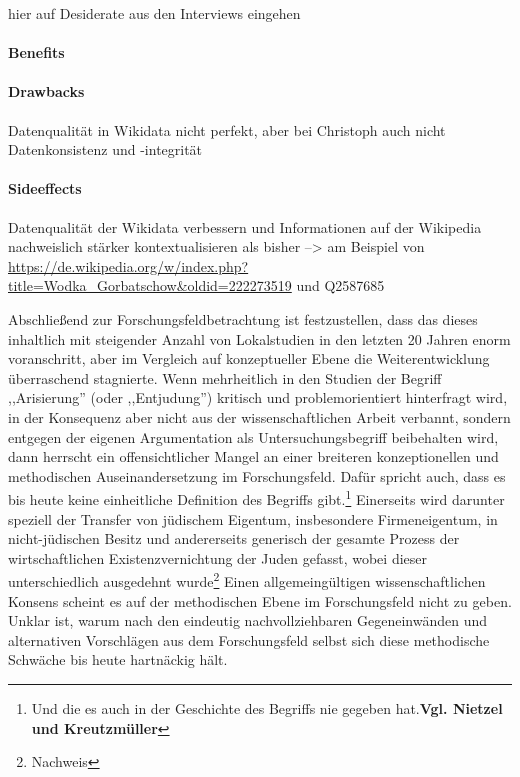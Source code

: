 hier auf Desiderate aus den Interviews eingehen

\paragraph{Benefits}

\paragraph{Drawbacks}

Datenqualität in Wikidata nicht perfekt, aber bei Christoph auch nicht
Datenkonsistenz und -integrität

\paragraph{Sideeffects}

Datenqualität der Wikidata verbessern und Informationen auf der Wikipedia nachweislich stärker kontextualisieren als bisher
--> am Beispiel von \url{https://de.wikipedia.org/w/index.php?title=Wodka_Gorbatschow&oldid=222273519} und Q2587685

Abschließend zur Forschungsfeldbetrachtung ist festzustellen, dass das dieses inhaltlich mit steigender Anzahl von Lokalstudien in den letzten 20 Jahren enorm voranschritt, aber im Vergleich auf konzeptueller Ebene die Weiterentwicklung überraschend stagnierte. Wenn mehrheitlich in den Studien der Begriff ,,Arisierung'' (oder ,,Entjudung'') kritisch und problemorientiert hinterfragt wird, in der Konsequenz aber nicht aus der wissenschaftlichen Arbeit verbannt, sondern entgegen der eigenen Argumentation als Untersuchungsbegriff beibehalten wird, dann herrscht ein offensichtlicher Mangel an einer breiteren konzeptionellen und methodischen Auseinandersetzung im Forschungsfeld. Dafür spricht auch, dass es bis heute keine einheitliche Definition des Begriffs gibt.\footnote{Und die es auch in der Geschichte des Begriffs nie gegeben hat.\textbf{Vgl. Nietzel und Kreutzmüller}} Einerseits wird darunter speziell der Transfer von jüdischem Eigentum, insbesondere Firmeneigentum, in nicht-jüdischen Besitz und andererseits generisch der gesamte Prozess der wirtschaftlichen Existenzvernichtung der Juden gefasst, wobei dieser unterschiedlich ausgedehnt wurde\footnote{Nachweis} Einen allgemeingültigen wissenschaftlichen Konsens scheint es auf der methodischen Ebene im Forschungsfeld nicht zu geben. Unklar ist, warum nach den eindeutig nachvollziehbaren Gegeneinwänden und alternativen Vorschlägen aus dem Forschungsfeld selbst sich diese methodische Schwäche bis heute hartnäckig hält.


